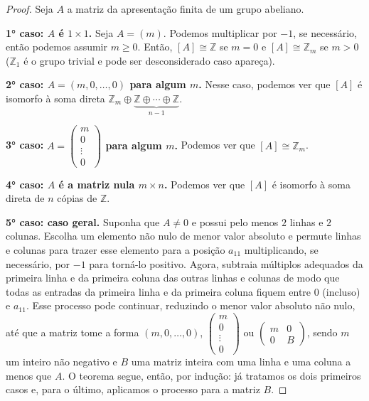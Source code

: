     	\begin{proof}
    		Seja $A$ a matriz da apresentação finita de um grupo abeliano.
    		
    		\par\textbf{1° caso: $A$ é $1\times1$.} Seja $A = (m)$. Podemos multiplicar por $-1$, se necessário,
    		então podemos assumir $m\geq0$. Então, $[A]\cong\mathbb{Z}$ se $m=0$ e $[A]\cong\mathbb{Z}_m$ se 
    		$m>0$ ($\mathbb{Z}_1$ é o grupo trivial e pode ser desconsiderado caso apareça).
    		
    		\par\textbf{2° caso: $A = (m,0,\dots,0)$ para algum $m$.} Nesse caso, podemos ver que $[A]$ é 
    		isomorfo à soma direta $\mathbb{Z}_m\oplus\underbrace{\mathbb{Z}\oplus\cdots\oplus\mathbb{Z}}_{n-1}$.
    		
    		\par\textbf{3° caso:} \textbf{$A = \begin{pmatrix}m\\0\\\vdots\\0\end{pmatrix}$ para algum $m$.} 
    		Podemos ver que $[A]\cong\mathbb{Z}_m$.
    		
    		\par\textbf{4° caso: $A$ é a matriz nula $m\times n$.} Podemos ver que $[A]$ é isomorfo à soma 
    		direta de $n$ cópias de $\mathbb{Z}$.
    		
    		\par\textbf{5° caso: caso geral.} Suponha que $A\neq0$ e possui pelo menos $2$ linhas e $2$ colunas.
    		Escolha um elemento não nulo de menor valor absoluto e permute linhas e colunas para trazer esse
    		elemento para a posição $a_{11}$ multiplicando, se necessário, por $-1$ para torná-lo positivo. 
    		Agora, subtraia múltiplos adequados da primeira linha e da primeira coluna das outras linhas e 
    		colunas de modo que todas as entradas da primeira linha e da primeira coluna fiquem entre 
    		$0$ (incluso) e $a_{11}$. Esse processo pode continuar, reduzindo o menor valor absoluto não nulo, 
    		até que a matriz tome a forma $(m,0,\dots,0)$, 
    		$\begin{pmatrix}
    		m\\
    		0\\
    		\vdots\\
    		0
    		\end{pmatrix}$ ou $\begin{pmatrix}
    		m & 0 \\
    		0 & B
    		\end{pmatrix}$, sendo $m$ um inteiro não negativo e $B$ uma matriz inteira com uma linha e uma 
    		coluna a menos que $A$. O teorema segue, então, por indução: já tratamos os dois primeiros casos e,
    		para o último, aplicamos o processo para a matriz $B$.  
    	\end{proof}
